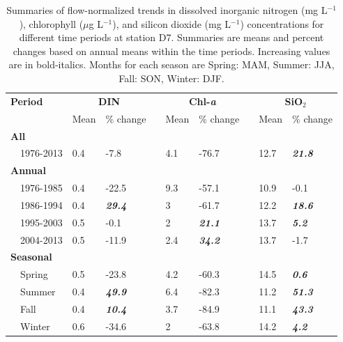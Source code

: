 \documentclass[letterpaper,12pt,oneside]{article}\usepackage[]{graphicx}\usepackage[]{color}
\begin{document}
\begin{table}[!tbp]
\caption{Summaries of flow-normalized trends in dissolved inorganic nitrogen (mg L$^{-1}$), chlorophyll ($\mu$g L$^{-1}$), and silicon dioxide (mg L$^{-1}$) concentrations for different time periods at station D7. Summaries are means and percent changes based on annual means within the time periods.  Increasing values are in bold-italics. Months for each season are Spring: MAM, Summer: JJA, Fall: SON, Winter: DJF.\label{tab:d7chg}} 
\begin{center}
\begin{tabular}{lllcllcll}
\hline\hline
\multicolumn{1}{l}{\bfseries Period}&\multicolumn{2}{c}{\bfseries DIN}&\multicolumn{1}{c}{\bfseries }&\multicolumn{2}{c}{\bfseries Chl-\textit{a}}&\multicolumn{1}{c}{\bfseries }&\multicolumn{2}{c}{\bfseries SiO$_2$}\tabularnewline
\cline{2-3} \cline{5-6} \cline{8-9}
\multicolumn{1}{l}{}&\multicolumn{1}{c}{Mean}&\multicolumn{1}{c}{\% change}&\multicolumn{1}{c}{}&\multicolumn{1}{c}{Mean}&\multicolumn{1}{c}{\% change}&\multicolumn{1}{c}{}&\multicolumn{1}{c}{Mean}&\multicolumn{1}{c}{\% change}\tabularnewline
\hline
{\bfseries All}&&&&&&&&\tabularnewline
~~1976-2013&0.4&-7.8&&4.1&-76.7&&12.7&\textit{\textbf{21.8}}\tabularnewline
\hline
{\bfseries Annual}&&&&&&&&\tabularnewline
~~1976-1985&0.4&-22.5&&9.3&-57.1&&10.9&-0.1\tabularnewline
~~1986-1994&0.4&\textit{\textbf{29.4}}&&3&-61.7&&12.2&\textit{\textbf{18.6}}\tabularnewline
~~1995-2003&0.5&-0.1&&2&\textit{\textbf{21.1}}&&13.7&\textit{\textbf{5.2}}\tabularnewline
~~2004-2013&0.5&-11.9&&2.4&\textit{\textbf{34.2}}&&13.7&-1.7\tabularnewline
\hline
{\bfseries Seasonal}&&&&&&&&\tabularnewline
~~Spring&0.5&-23.8&&4.2&-60.3&&14.5&\textit{\textbf{0.6}}\tabularnewline
~~Summer&0.4&\textit{\textbf{49.9}}&&6.4&-82.3&&11.2&\textit{\textbf{51.3}}\tabularnewline
~~Fall&0.4&\textit{\textbf{10.4}}&&3.7&-84.9&&11.1&\textit{\textbf{43.3}}\tabularnewline
~~Winter&0.6&-34.6&&2&-63.8&&14.2&\textit{\textbf{4.2}}\tabularnewline
\hline
\end{tabular}\end{center}

\end{table}
\end{document}
